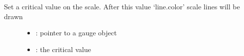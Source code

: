 \documentclass[letterpaper,10pt,english]{sphinxmanual}
\begin{document}

\begin{fulllineitems}
\label{\detokenize{object-types/gauge:_CPPv427lv_gauge_set_critical_valueP8lv_obj_t7int16_t}}%
\pysigstartmultiline
{}\label{\detokenize{object-types/gauge:lv__gauge_8h_1ae84e39d6d3d1caaf4a8d3521ad8a409e}}%
\pysigstopmultiline
Set a critical value on the scale. After this value ‘line.color’ scale lines will be drawn \begin{description}
\item[{}] \leavevmode\begin{itemize}
\item {} 
: pointer to a gauge object 

\item {} 
: the critical value 

\end{itemize}

\end{description}


\end{fulllineitems}

\end{document}

